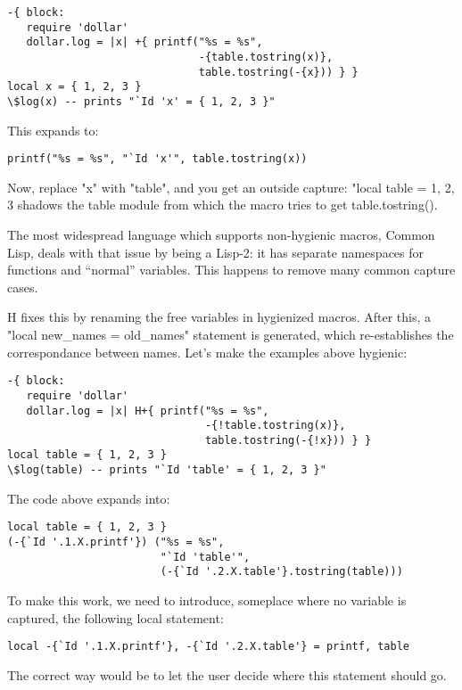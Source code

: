 \begin{Verbatim}
-{ block:
   require 'dollar'
   dollar.log = |x| +{ printf("%s = %s", 
                              -{table.tostring(x)}, 
                              table.tostring(-{x})) } }
local x = { 1, 2, 3 }
\$log(x) -- prints "`Id 'x' = { 1, 2, 3 }"
\end{Verbatim}

This expands to:
\begin{Verbatim}
printf("%s = %s", "`Id 'x'", table.tostring(x))
\end{Verbatim}

Now, replace "x" with "table", and you get an outside capture: "local
table = { 1, 2, 3 } shadows the table module from which the macro
tries to get table.tostring().

The most widespread language which supports non-hygienic macros,
Common Lisp, deals with that issue by being a Lisp-2: it has separate
namespaces for functions and ``normal'' variables. This happens to
remove many common capture cases. 

H fixes this by renaming the free variables in hygienized
macros. After this, a "local new\_names = old\_names" statement is
generated, which re-establishes the correspondance between
names. Let's make the examples above hygienic:

\begin{Verbatim}
-{ block:
   require 'dollar'
   dollar.log = |x| H+{ printf("%s = %s", 
                               -{!table.tostring(x)}, 
                               table.tostring(-{!x})) } }
local table = { 1, 2, 3 }
\$log(table) -- prints "`Id 'table' = { 1, 2, 3 }"
\end{Verbatim}

The code above expands into:

\begin{Verbatim}
local table = { 1, 2, 3 }
(-{`Id '.1.X.printf'}) ("%s = %s",
                        "`Id 'table'",
                        (-{`Id '.2.X.table'}.tostring(table)))
\end{Verbatim}

To make this work, we need to introduce, someplace where no variable
is captured, the following local statement:
\begin{Verbatim}
local -{`Id '.1.X.printf'}, -{`Id '.2.X.table'} = printf, table
\end{Verbatim}

The correct way would be to let the user decide where this statement
should go.

